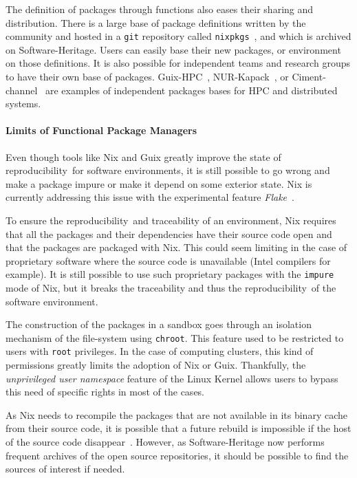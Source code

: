 \documentclass[sigconf,natbib=false]{acmart}
\newcommand{\repro}{reproducibility}
\begin{document}
The definition of packages through functions also eases their sharing and distribution.
There is a large base of package definitions written by the community and hosted in a \texttt{git} repository called \texttt{nixpkgs}\ \cite{nixpkgs}, and which is archived on Software-Heritage.
Users can easily base their new packages, or environment on those definitions.
It is also possible for independent teams and research groups to have their own base of packages.
Guix-HPC\ \cite{guix-hpc}, NUR-Kapack\ \cite{kapack}, or Ciment-channel\ \cite{ciment_channel} are examples of independent packages bases for HPC and distributed systems.

\paragraph{Limits of Functional Package Managers}

Even though tools like Nix and Guix greatly improve the state of \repro\ for software environments, it is still possible to go wrong and make a package impure or make it depend on some exterior state.
Nix is currently addressing this issue with the experimental feature \emph{Flake}\ \cite{flakes}.

To ensure the \repro\ and traceability of an environment, Nix requires that all the packages and their dependencies have their source code open and that the packages are packaged with Nix.
This could seem limiting in the case of proprietary software where the source code is unavailable (Intel compilers for example).
It is still possible to use such proprietary packages with the \texttt{impure} mode of Nix, but it breaks the traceability and thus the \repro\ of the software environment. 

The construction of the packages in a sandbox goes through an isolation mechanism of the file-system using \texttt{chroot}.
This feature used to be restricted to users with \texttt{root} privileges.
In the case of computing clusters, this kind of permissions greatly limits the adoption of Nix or Guix.
Thankfully, the \emph{unprivileged user namespace} feature of the Linux Kernel allows users to bypass this need of specific rights in most of the cases.

As Nix needs to recompile the packages that are not available in its binary cache from their source code, it is possible that a future rebuild is impossible if the host of the source code disappear\ \cite{blinry}.
However, as Software-Heritage now performs frequent archives of the open source repositories, it should be possible to find the sources of interest if needed.
\end{document}
